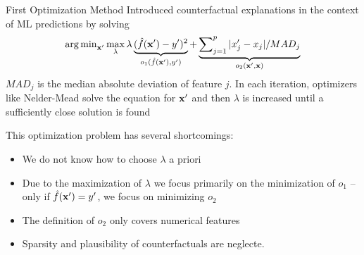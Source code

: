 \documentclass[11pt,compress,t,notes=noshow, aspectratio=169, xcolor=table]{beamer}
\begin{document}
\begin{frame}{First Optimization Method }
Introduced counterfactual explanations in the context of ML predictions by solving
		\begin{equation}
			\argmin_{\xv'} \max_{\lambda} \lambda \underbrace{(\fh(\xv') - y')^2}_{o_1(\fh(\xv'), y')} + \underbrace{\sum\nolimits_{j = 1}^p |x'_j - x_j|/MAD_j}_{o_2(\xv', \xv)}
		\end{equation}
	$MAD_j$ is the median absolute deviation of feature $j$. In each iteration, optimizers like Nelder-Mead solve the equation for $\xv'$ and then $\lambda$ is increased until a sufficiently close solution is found \\[0.2cm]
	
	\pause
	
	This optimization problem has several shortcomings: 	
	\begin{itemize}[<+->]
		\item We do not know how to choose $\lambda$ a priori 
		\item Due to the maximization of $\lambda$ we focus primarily on the minimization of $o_1$ -- only if $\fh(\xv') = y'$, we focus on minimizing $o_2$ 
		\item The definition of $o_2$ only covers numerical features 
		\item Sparsity and plausibility of counterfactuals are neglecte. 
	\end{itemize}
	


\end{frame}
\end{document}
